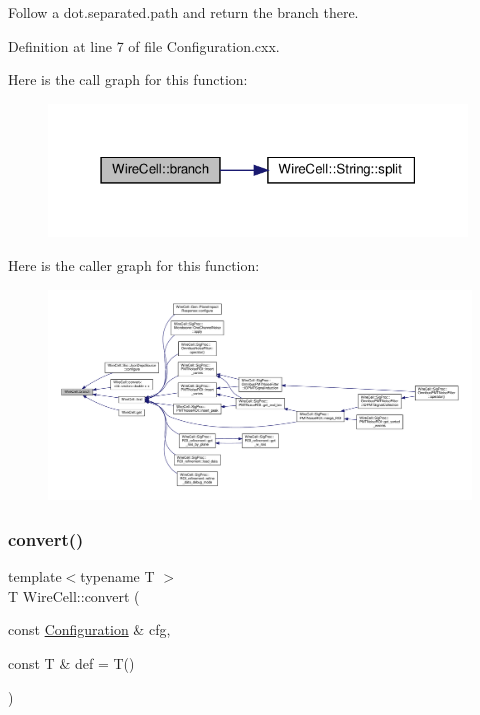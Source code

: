Follow a dot.\+separated.\+path and return the branch there. 



Definition at line 7 of file Configuration.\+cxx.

Here is the call graph for this function\+:
\nopagebreak
\begin{figure}[H]
\begin{center}
\leavevmode
\includegraphics[width=315pt]{namespace_wire_cell_ade8a8d63c0beb7335d7f969903bfeedc_cgraph}
\end{center}
\end{figure}
Here is the caller graph for this function\+:
\nopagebreak
\begin{figure}[H]
\begin{center}
\leavevmode
\includegraphics[width=350pt]{namespace_wire_cell_ade8a8d63c0beb7335d7f969903bfeedc_icgraph}
\end{center}
\end{figure}
\mbox{\label{namespace_wire_cell_a5f6648d6ae801b20a17b8a35fd3306e5}} 
\subsubsection{\texorpdfstring{convert()}{convert()}}
{\footnotesize\ttfamily template$<$typename T $>$ \\
T Wire\+Cell\+::convert (\begin{DoxyParamCaption}\item[{const \hyperlink{namespace_wire_cell_a9f705541fc1d46c608b3d32c182333ee}{Configuration} \&}]{cfg,  }\item[{const T \&}]{def = {\ttfamily T()} }\end{DoxyParamCaption})}



